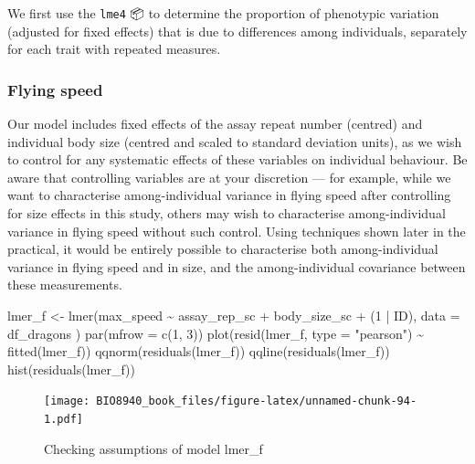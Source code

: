 \documentclass[
  12pt,
]{book}
\newenvironment{Shaded}{\begin{snugshade}}{\end{snugshade}}
\newcommand{\AttributeTok}[1]{\textcolor[rgb]{0.77,0.63,0.00}{#1}}
\newcommand{\DecValTok}[1]{\textcolor[rgb]{0.00,0.00,0.81}{#1}}
\newcommand{\FunctionTok}[1]{\textcolor[rgb]{0.00,0.00,0.00}{#1}}
\newcommand{\NormalTok}[1]{#1}
\newcommand{\OtherTok}[1]{\textcolor[rgb]{0.56,0.35,0.01}{#1}}
\newcommand{\SpecialCharTok}[1]{\textcolor[rgb]{0.00,0.00,0.00}{#1}}
\newcommand{\StringTok}[1]{\textcolor[rgb]{0.31,0.60,0.02}{#1}}
\begin{document}
We first use the \texttt{lme4} 📦 to determine the proportion of phenotypic variation (adjusted for fixed effects) that is due to differences among individuals, separately for each trait with repeated measures.

\hypertarget{flying-speed}{%
\subsubsection{Flying speed}\label{flying-speed}}

Our model includes fixed effects of the assay repeat number (centred) and individual body size (centred and scaled to standard deviation units), as we wish to control for any systematic effects of these variables on individual behaviour. Be aware that controlling variables are at your discretion --- for example, while we want to characterise among-individual variance in flying speed after controlling for size effects in this study, others may wish to characterise among-individual variance in flying speed without such control. Using techniques shown later in the practical, it would be entirely possible to characterise both among-individual variance in flying speed and in size, and the among-individual covariance between these measurements.

\begin{Shaded}
\begin{Highlighting}[]
\NormalTok{lmer\_f }\OtherTok{\textless{}{-}} \FunctionTok{lmer}\NormalTok{(max\_speed }\SpecialCharTok{\textasciitilde{}}\NormalTok{ assay\_rep\_sc }\SpecialCharTok{+}\NormalTok{ body\_size\_sc }\SpecialCharTok{+}\NormalTok{ (}\DecValTok{1} \SpecialCharTok{|}\NormalTok{ ID),}
  \AttributeTok{data =}\NormalTok{ df\_dragons}
\NormalTok{)}
\FunctionTok{par}\NormalTok{(}\AttributeTok{mfrow =} \FunctionTok{c}\NormalTok{(}\DecValTok{1}\NormalTok{, }\DecValTok{3}\NormalTok{))}
\FunctionTok{plot}\NormalTok{(}\FunctionTok{resid}\NormalTok{(lmer\_f, }\AttributeTok{type =} \StringTok{"pearson"}\NormalTok{) }\SpecialCharTok{\textasciitilde{}} \FunctionTok{fitted}\NormalTok{(lmer\_f))}
\FunctionTok{qqnorm}\NormalTok{(}\FunctionTok{residuals}\NormalTok{(lmer\_f))}
\FunctionTok{qqline}\NormalTok{(}\FunctionTok{residuals}\NormalTok{(lmer\_f))}
\FunctionTok{hist}\NormalTok{(}\FunctionTok{residuals}\NormalTok{(lmer\_f))}
\end{Highlighting}
\end{Shaded}

\begin{figure}
\centering
\texttt{[image: BIO8940\_book\_files/figure-latex/unnamed-chunk-94-1.pdf]}
\caption{\label{fig:unnamed-chunk-94}Checking assumptions of model lmer\_f}
\end{figure}
\end{document}
